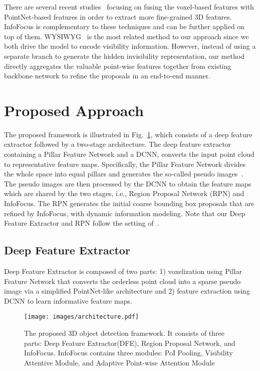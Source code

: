 \documentclass[runningheads]{llncs}
\begin{document}
There are several recent studies~\cite{chen2019fast,liu2019point} focusing on fusing the voxel-based features with PointNet-based features in order to extract more fine-grained 3D features. InfoFocus is complementary to these techniques and can be further applied on top of them. WYSIWYG~\cite{hu2019you} is the most related method to our approach since we both drive the model to encode visibility information. However, instead of using a separate branch to generate the hidden invisibility representation, our method directly aggregates the valuable point-wise features together from existing backbone network to refine the proposals in an end-to-end manner. 

\section{Proposed Approach}
The proposed framework is illustrated in Fig.~\ref{fig:arch}, which consists of a deep feature extractor followed by a two-stage architecture. The deep feature extractor containing a Pillar Feature Network and a DCNN, converts the input point cloud to representative feature maps. Specifically, the Pillar Feature Network divides the whole space into equal pillars and generates the so-called pseudo images~\cite{lang2019PointPillars}. The pseudo images are then processed by the DCNN to obtain the feature maps which are shared by the two stages, i.e., Region Proposal Network (RPN) and InfoFocus. The RPN generates the initial coarse bounding box proposals that are refined by InfoFocus, with dynamic information modeling. Note that our Deep Feature Extractor and RPN follow the setting of~\cite{lang2019PointPillars}.


\subsection{Deep Feature Extractor}
Deep Feature Extractor is composed of two parts: 1) voxelization using Pillar Feature Network that converts the orderless point cloud into a sparse pseudo image via a simplified PointNet-like architecture and 2) feature extraction using DCNN to learn informative feature maps.


\begin{figure}
\centering
  \texttt{[image: images/architecture.pdf]}
  \\
  \caption{The proposed 3D object detection framework. It consists of three parts: Deep Feature Extractor(DFE), Region Proposal Network, and InfoFocus. InfoFocus contains three modules: PoI Pooling, Visibility Attentive Module, and Adaptive Point-wise Attention Module}
\label{fig:arch}
\end{figure}
\end{document}
